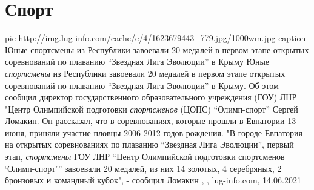  
 
 
 
 
\chapter{Спорт}

\ifcmt
  pic http://img.lug-info.com/cache/e/4/1623679443_779.jpg/1000wm.jpg
	caption Юные спортсмены из Республики завоевали 20 медалей в первом этапе открытых соревнований по плаванию \enquote{Звездная Лига Эволюции} в Крыму
\fi
Юные \emph{спортсмены} из Республики завоевали 20 медалей в первом этапе открытых
соревнований по плаванию \enquote{Звездная Лига Эволюции} в Крыму. Об этом сообщил
директор государственного образовательного учреждения (ГОУ) ЛНР "Центр
Олимпийской подготовки \emph{спортсменов} (ЦОПС) \enquote{Олимп-спорт} Сергей Ломакин.
Он рассказал, что в соревнованиях, которые прошли в Евпатории 13 июня, приняли
участие пловцы 2006-2012 годов рождения.
"В городе Евпатория на открытых соревнованиях по плаванию 
\enquote{Звездная Лига
Эволюции}, первый этап, \emph{спортсмены} ГОУ ЛНР \enquote{Центр Олимпийской подготовки
спортсменов \enquote{Олимп-спорт}} завоевали 20 медалей, из них 14 золотых, 4
серебряных, 2 бронзовых и командный кубок", - сообщил Ломакин
, 
, lug-info.com, 14.06.2021

